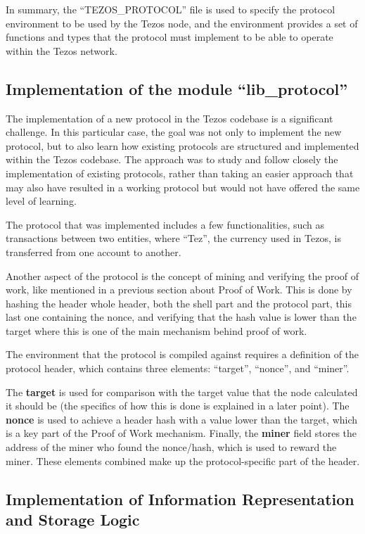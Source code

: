 In summary, the ``TEZOS\_PROTOCOL'' file is used to specify the protocol environment to be used by the Tezos node, and the environment provides a set of functions and types that the protocol must implement to be able to operate within the Tezos network.

\subsection*{Implementation of the module ``lib\_protocol''}

The implementation of a new protocol in the Tezos codebase is a significant challenge.
In this particular case, the goal was not only to implement the new protocol, but to also learn how existing protocols are structured and implemented within the Tezos codebase. The approach was to study and follow closely the implementation of existing protocols, rather than taking an easier approach that may also have resulted in a working protocol but would not have offered the same level of learning.

The protocol that was implemented includes a few functionalities, such as transactions between two entities, where ``Tez'', the currency used in Tezos, is transferred from one account to another.

Another aspect of the protocol is the concept of mining and verifying the proof of work, like mentioned in a previous section about Proof of Work.
This is done by hashing the header whole header, both the shell part and the protocol part, this last one containing the nonce, and verifying that the hash value is lower than the target where this is one of the main mechanism behind proof of work.

The environment that the protocol is compiled against requires a definition of the protocol header, which contains three elements: ``target'', ``nonce'', and ``miner''.

The \textbf{target} is used for comparison with the target value that the node calculated it should be (the specifics of how this is done is explained in a later point).
The \textbf{nonce} is used to achieve a header hash with a value lower than the target, which is a key part of the Proof of Work mechanism.
Finally, the \textbf{miner} field stores the address of the miner who found the nonce/hash, which is used to reward the miner. These elements combined make up the protocol-specific part of the header.


\subsection*{Implementation of Information Representation and Storage Logic}

